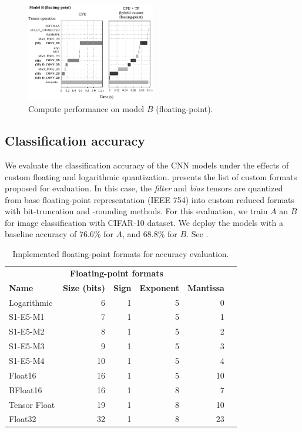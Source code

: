 \begin{figure}[t!]
	\centering
	\includegraphics[width=0.5\textwidth]{../figures/sched_B_float.pdf}
	\caption{Compute performance on model $B$ (floating-point).}
	\label{fig:sched_model_b_float}
\end{figure}

\subsection{Classification accuracy}

We evaluate the classification accuracy of the CNN models under the effects of custom floating and logarithmic quantization.  presents the list of custom formats proposed for evaluation. In this case, the \emph{filter} and \emph{bias} tensors are quantized from base floating-point representation (IEEE 754) into custom reduced formats with bit-truncation and -rounding methods. For this evaluation, we train $A$ an $B$ for image classification with CIFAR-10 dataset. We deploy the models with a baseline accuracy of 76.6\% for $A$, and 68.8\% for $B$. See .

\begin{table}[!htp]\centering
	\caption{Implemented floating-point formats for accuracy evaluation.}\label{tab:formats}
	\scriptsize
	\begin{tabular}{lrrrrr}\toprule
		\multicolumn{5}{c}{\textbf{Floating-point formats}} \\\cmidrule{1-5}
		\textbf{Name} &\textbf{Size (bits)} &\textbf{Sign} &\textbf{Exponent} &\textbf{Mantissa} \\\midrule
		Logarithmic &6 &1 &5 &0 \\
		S1-E5-M1 &7 &1 &5 &1 \\
		S1-E5-M2 &8 &1 &5 &2 \\
		S1-E5-M3 &9 &1 &5 &3 \\
		S1-E5-M4 &10 &1 &5 &4 \\
		Float16 &16 &1 &5 &10 \\
		BFloat16 &16 &1 &8 &7 \\
		Tensor Float &19 &1 &8 &10 \\
		Float32 &32 &1 &8 &23 \\
		\bottomrule
	\end{tabular}
\end{table}

